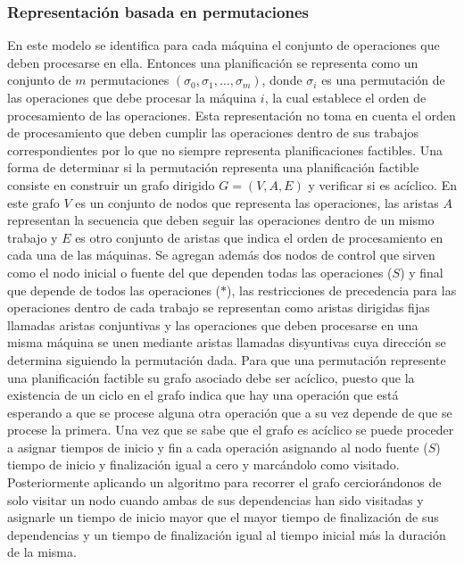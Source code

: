 \subsubsection*{Representación basada en permutaciones} 
En este modelo se identifica para cada máquina el conjunto de operaciones que deben procesarse en ella. Entonces una planificación se representa como un conjunto de $m$ permutaciones $(\sigma_0,\sigma_1,\dots,\sigma_m)$, donde $\sigma_i$ es una permutación de las operaciones que debe procesar la máquina $i$, la cual establece el orden de procesamiento de las operaciones.
%
Esta representación no toma en cuenta el orden de procesamiento que deben cumplir las operaciones dentro de sus trabajos correspondientes por lo que no siempre representa planificaciones factibles.
%
Una forma de determinar si la permutación representa una planificación factible consiste en construir un grafo dirigido $G=(V,A,E)$ y verificar si es acíclico.
%
En este grafo $V$ es un conjunto de nodos que representa las operaciones, las aristas $A$ representan la secuencia que deben seguir las operaciones dentro de un mismo trabajo y $E$ es otro conjunto de aristas que indica el orden de procesamiento en cada una de las máquinas. 
%
Se agregan además dos nodos de control que sirven como el nodo inicial o fuente del que dependen todas las operaciones ($S$) y final que depende de todos las operaciones ($*$), las restricciones de precedencia para las operaciones dentro de cada trabajo se representan como aristas dirigidas fijas llamadas aristas conjuntivas y las operaciones que deben procesarse en una misma máquina se unen mediante aristas llamadas disyuntivas cuya dirección se determina siguiendo la permutación dada. 
%
Para que una permutación represente una planificación factible su grafo asociado debe ser acíclico, puesto que la existencia de un ciclo en el grafo indica que hay una operación que está esperando a que se procese alguna otra operación que a su vez depende de que se procese la primera.
%
Una vez que se sabe que el grafo es acíclico se puede proceder a asignar tiempos de inicio y fin a cada operación asignando al nodo fuente ($S$) tiempo de inicio y finalización igual a cero y marcándolo como visitado. Posteriormente aplicando un algoritmo para recorrer el grafo cerciorándonos de solo visitar un nodo cuando ambas de sus dependencias han sido visitadas y asignarle un tiempo de inicio mayor que el mayor tiempo de finalización de sus dependencias y un tiempo de finalización igual al tiempo inicial más la duración de la misma.

